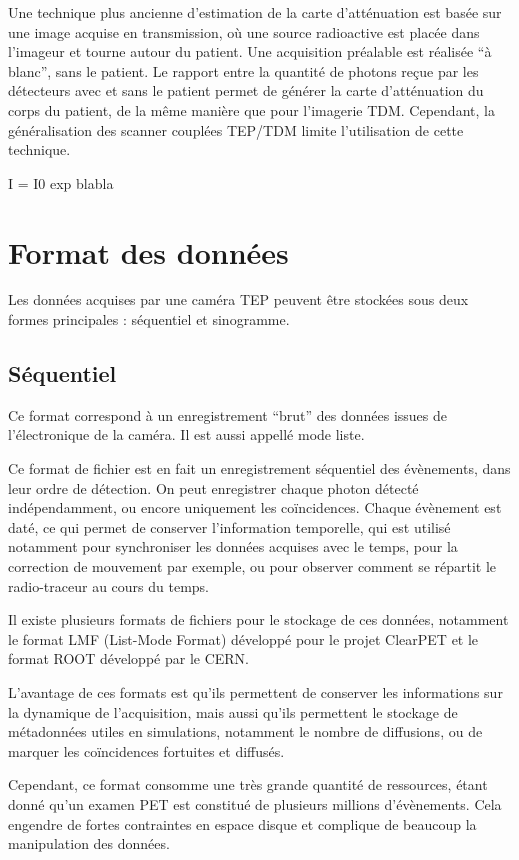 Une technique plus ancienne d'estimation de la carte d'atténuation est basée sur une image acquise en transmission, où une source radioactive est placée dans l'imageur et tourne autour du patient. Une acquisition  préalable est réalisée ``à blanc'', sans le patient. Le rapport entre la quantité de photons reçue par les détecteurs avec et sans le patient permet de générer la carte d'atténuation du corps du patient, de la même manière que pour l'imagerie TDM. Cependant, la généralisation des scanner couplées TEP/TDM limite l'utilisation de cette technique.

I = I0 exp blabla



	\section{Format des données}
Les données acquises par une caméra TEP peuvent être stockées sous deux formes principales : séquentiel et sinogramme.

		\subsection{Séquentiel}

Ce format correspond à un enregistrement ``brut'' des données issues de l'électronique de la caméra. Il est aussi appellé mode liste.

Ce format de fichier est en fait un enregistrement séquentiel des évènements, dans leur ordre de détection. On peut enregistrer chaque photon détecté indépendamment, ou encore uniquement les coïncidences. Chaque évènement est daté, ce qui permet de conserver l’information temporelle, qui est utilisé notamment pour synchroniser les données acquises avec le temps, pour la correction de mouvement par exemple, ou pour observer comment se répartit le radio-traceur au cours du temps.

Il existe plusieurs formats de fichiers pour le stockage de ces données, notamment le format LMF (List-Mode Format) développé pour le projet ClearPET et le format ROOT développé par le CERN. 

L'avantage de ces formats est qu'ils permettent de conserver les informations sur la dynamique de l'acquisition, mais aussi qu'ils permettent le stockage de métadonnées utiles en simulations, notamment le nombre de diffusions, ou de marquer les coïncidences fortuites et diffusés.

Cependant, ce format consomme une très grande quantité de ressources, étant donné qu'un examen PET est constitué de plusieurs millions d'évènements. Cela engendre de fortes contraintes en espace disque et complique de beaucoup la manipulation des données. 

